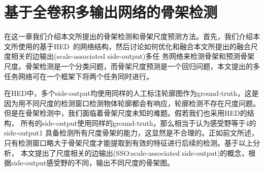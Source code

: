 \documentclass[UTF8]{ctexart}
\numberwithin{equation}{section} %
\numberwithin{table}{section} %
\begin{document}
\pagebreak
\section{基于全卷积多输出网络的骨架检测}
在这一章我们介绍本文所提出的骨架检测和骨架尺度预测方法。首先，我们介绍本文所使用的基于HED~\cite{xie2015holistically}的网络结构，然后讨论如何优化和融合本文所提出的融合尺度相关的边输出(scale-associated side-output)多任
务网络来检测骨架和预测骨架尺度。骨架检测是一个分类问题，而骨架尺度预测是一个回归问题，本文提出的多任务网络可在一个框架下将两个任务同时进行。

在HED中，多个side-output均使用同样的人工标注轮廓图作为ground-truth，这是因为用不同尺度的检测窗口检测物体轮廓都会有响应，轮廓检测不存在尺度问题。但是在骨架检测中，我们面临着骨架尺度未知的难题。假若我们也采用HED的结构，
所有的side-output使用同样的ground-truth，那么相当于认为感受野等于4的 side-output1 具备检测所有尺度骨架的能力，这显然是不合理的。正如前文所述，只有检测窗口略大于骨架尺度才能提取到有效的特征进行后续的检测。基于以上分析，
本文提出了尺度相关的边输出(SSO:scale-associated side-output)的概念，根据side-output感受野的不同，输出不同尺度的骨架图。
\end{document}
